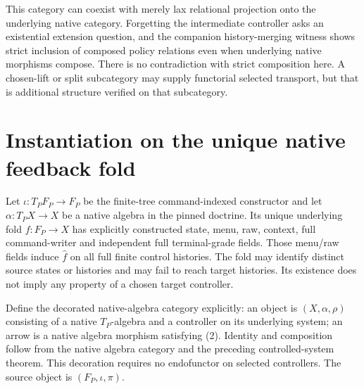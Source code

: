 \documentclass[11pt]{article}
\begin{document}
This category can coexist with merely lax relational projection onto the underlying native category. Forgetting the intermediate controller asks an existential extension question, and the companion history-merging witness shows strict inclusion of composed policy relations even when underlying native morphisms compose. There is no contradiction with strict composition here. A chosen-lift or split subcategory may supply functorial selected transport, but that is additional structure verified on that subcategory.

\section{Instantiation on the unique native feedback fold}
Let $\iota:T_PF_P\to F_P$ be the finite-tree command-indexed constructor and let $\alpha:T_PX\to X$ be a native algebra in the pinned doctrine. Its unique underlying fold $f:F_P\to X$ has explicitly constructed state, menu, raw, context, full command-writer and independent full terminal-grade fields. Those menu/raw fields induce $\widehat f$ on all full finite control histories. The fold may identify distinct source states or histories and may fail to reach target histories. Its existence does not imply any property of a chosen target controller.

Define the decorated native-algebra category explicitly: an object is $(X,\alpha,\rho)$ consisting of a native $T_P$-algebra and a controller on its underlying system; an arrow is a native algebra morphism satisfying (2). Identity and composition follow from the native algebra category and the preceding controlled-system theorem. This decoration requires no endofunctor on selected controllers. The source object is $(F_P,\iota,\pi)$.
\end{document}
